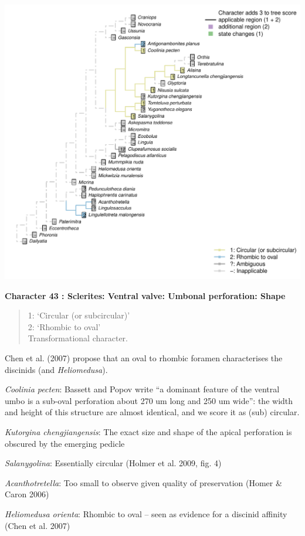 \documentclass[]{book}
\theoremstyle{definition}
\theoremstyle{definition}
\theoremstyle{definition}
\theoremstyle{remark}
\begin{document}
\includegraphics{Brachiopod_phylogeny_files/figure-latex/unnamed-chunk-5-43.pdf}

\textbf{Character 43 : Sclerites: Ventral valve: Umbonal perforation:
Shape }

\begin{quote}
1: `Circular (or subcircular)'\\
2: `Rhombic to oval'\\
Transformational character.
\end{quote}

Chen et al. (2007) propose that an oval to rhombic foramen characterises
the discinids (and \emph{Heliomedusa}).

\emph{Coolinia pecten}: Bassett and Popov write ``a dominant feature of
the ventral umbo is a sub-oval perforation about 270 um long and 250 um
wide'': the width and height of this structure are almost identical, and
we score it as (sub) circular.

\emph{Kutorgina chengjiangensis}: The exact size and shape of the apical
perforation is obscured by the emerging pedicle

\emph{Salanygolina}: Essentially circular (Holmer et al. 2009, fig. 4)

\emph{Acanthotretella}: Too small to observe given quality of
preservation (Homer \& Caron 2006)

\emph{Heliomedusa orienta}: Rhombic to oval -- seen as evidence for a
discinid affinity (Chen et al. 2007)
\end{document}

